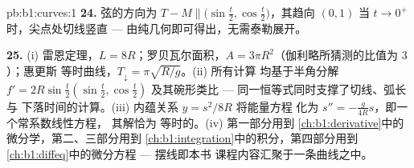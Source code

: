 \begin{solution}{pb:b1:curves:1}
\textbf{24.} 弦的方向为 $T - M \parallel
\bigl(\sin\frac t2, \cos\frac t2\bigr)$，其趋向 $(0, 1)$
当 $t \to 0^{+}$ 时，尖点处切线竖直 ---
由纯几何即可得出，无需泰勒展开。

\textbf{25.} (i) 雷恩定理，$L = 8R$；罗贝瓦尔面积，$A =
3\pi R^2$（伽利略所猜测的比值为 $3$）；惠更斯
等时曲线，$T_\downarrow = \pi\sqrt{R/g}$。(ii) 所有计算
均基于半角分解 $f' =
2R\sin\frac t2(\sin\frac t2, \cos\frac t2)$ 及其碗形类比
--- 同一恒等式同时支撑了切线、弧长与
下落时间的计算。(iii) 内蕴关系 $y = s^2/8R$ 将能量方程
化为 $s'' = -\frac{g}{4R}s$，即一个常系数线性方程，
其解恰为
等时的。(iv) 第一部分用到
\cref{ch:b1:derivative}中的微分学，第二、三部分用到
\cref{ch:b1:integration}中的积分，第四部分用到
\cref{ch:b1:diffeq}中的微分方程 --- 摆线即本书
课程内容汇聚于一条曲线之中。
\end{solution}
